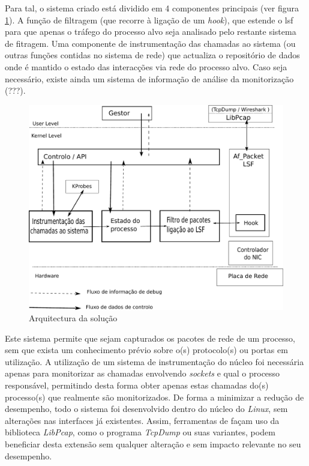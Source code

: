\documentclass[a4paper]{llncs}
\begin{document}
Para tal, o sistema criado está dividido em 4 componentes principais (ver figura \ref{arquitectura}). A função de filtragem (que recorre à ligação de um \textit{hook}), que estende o lsf para que apenas o tráfego do processo alvo seja analisado pelo restante sistema de fitragem. Uma componente de instrumentação das chamadas ao sistema (ou outras funções contidas no sistema de rede) que actualiza o repositório de dados onde é mantido o estado das interacções via rede do processo alvo. Caso seja necessário, existe ainda um sistema de informação de análise da monitorização  (???).

\begin{figure}[htbp]
\begin{center}
\includegraphics[scale=0.5]{interface.pdf} 
\caption{Arquitectura da solução}
\label{arquitectura}
\end{center}
\end{figure}


Este sistema permite que sejam capturados os pacotes de rede de um processo, sem que exista um conhecimento prévio sobre o(s) protocolo(s) ou portas em utilização. A utilização de um sistema de instrumentação do núcleo foi necessária apenas para monitorizar as chamadas envolvendo \emph{sockets} e qual o processo responsável, permitindo desta forma obter apenas estas chamadas do(s) processo(s) que realmente são monitorizados. De forma a minimizar a redução de desempenho, todo o sistema foi desenvolvido dentro do núcleo do \textit{Linux}, sem alterações nas interfaces já existentes.  Assim, ferramentas de façam uso da biblioteca \textit{LibPcap}, como o programa \textit{TcpDump} ou suas variantes, podem beneficiar desta extensão sem qualquer alteração e sem impacto relevante no seu desempenho.
\end{document}
